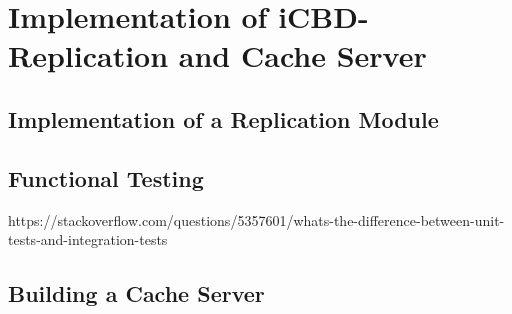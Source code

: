 \chapter{Implementation of iCBD-Replication and Cache Server}
\label{cha:replication}


\section{Implementation of a Replication Module}
\label{sec:replication_impl}

\section{Functional Testing}
\label{sec:functional_testing}

https://stackoverflow.com/questions/5357601/whats-the-difference-between-unit-tests-and-integration-tests

\section{Building a Cache Server}
\label{sec:cache_server}

